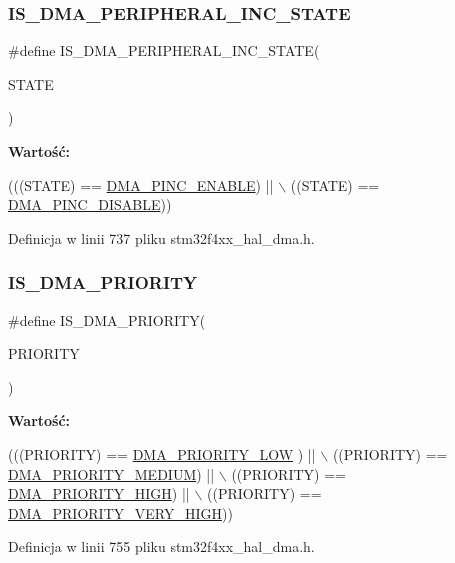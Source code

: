 \subsubsection{\texorpdfstring{I\+S\+\_\+\+D\+M\+A\+\_\+\+P\+E\+R\+I\+P\+H\+E\+R\+A\+L\+\_\+\+I\+N\+C\+\_\+\+S\+T\+A\+TE}{IS\_DMA\_PERIPHERAL\_INC\_STATE}}
{\footnotesize\ttfamily \#define I\+S\+\_\+\+D\+M\+A\+\_\+\+P\+E\+R\+I\+P\+H\+E\+R\+A\+L\+\_\+\+I\+N\+C\+\_\+\+S\+T\+A\+TE(\begin{DoxyParamCaption}\item[{}]{S\+T\+A\+TE }\end{DoxyParamCaption})}

{\bfseries Wartość\+:}
\begin{DoxyCode}
(((STATE) == \hyperlink{group___d_m_a___peripheral__incremented__mode_gab6d84e5805302516d26c06fb4497a346}{DMA\_PINC\_ENABLE}) || \(\backslash\)
                                            ((STATE) == \hyperlink{group___d_m_a___peripheral__incremented__mode_ga63e2aff2973d1a8f01d5d7b6e4894f39}{DMA\_PINC\_DISABLE}))
\end{DoxyCode}


Definicja w linii 737 pliku stm32f4xx\+\_\+hal\+\_\+dma.\+h.

\mbox{\label{group___d_m_a___private___macros_gaa1cae2ab458948511596467c87cd02b6}} 
\subsubsection{\texorpdfstring{I\+S\+\_\+\+D\+M\+A\+\_\+\+P\+R\+I\+O\+R\+I\+TY}{IS\_DMA\_PRIORITY}}
{\footnotesize\ttfamily \#define I\+S\+\_\+\+D\+M\+A\+\_\+\+P\+R\+I\+O\+R\+I\+TY(\begin{DoxyParamCaption}\item[{}]{P\+R\+I\+O\+R\+I\+TY }\end{DoxyParamCaption})}

{\bfseries Wartość\+:}
\begin{DoxyCode}
(((PRIORITY) == \hyperlink{group___d_m_a___priority__level_ga0d1ed2bc9229ba3c953002bcf3a72130}{DMA\_PRIORITY\_LOW} )   || \(\backslash\)
                                   ((PRIORITY) == \hyperlink{group___d_m_a___priority__level_gad6fbeee76fd4a02cbed64365bb4c1781}{DMA\_PRIORITY\_MEDIUM}) || \(\backslash\)
                                   ((PRIORITY) == \hyperlink{group___d_m_a___priority__level_ga6b2f5c5e22895f8b4bd52a27ec6cae2a}{DMA\_PRIORITY\_HIGH})   || \(\backslash\)
                                   ((PRIORITY) == \hyperlink{group___d_m_a___priority__level_gaed0542331a4d875d1d8d5b2878e9372c}{DMA\_PRIORITY\_VERY\_HIGH}))
\end{DoxyCode}


Definicja w linii 755 pliku stm32f4xx\+\_\+hal\+\_\+dma.\+h.

